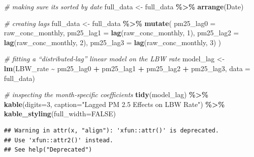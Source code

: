 \documentclass[
]{article}
\newenvironment{Shaded}{\begin{snugshade}}{\end{snugshade}}
\newcommand{\AttributeTok}[1]{\textcolor[rgb]{0.13,0.29,0.53}{#1}}
\newcommand{\CommentTok}[1]{\textcolor[rgb]{0.56,0.35,0.01}{\textit{#1}}}
\newcommand{\ConstantTok}[1]{\textcolor[rgb]{0.56,0.35,0.01}{#1}}
\newcommand{\DecValTok}[1]{\textcolor[rgb]{0.00,0.00,0.81}{#1}}
\newcommand{\FunctionTok}[1]{\textcolor[rgb]{0.13,0.29,0.53}{\textbf{#1}}}
\newcommand{\NormalTok}[1]{#1}
\newcommand{\OtherTok}[1]{\textcolor[rgb]{0.56,0.35,0.01}{#1}}
\newcommand{\SpecialCharTok}[1]{\textcolor[rgb]{0.81,0.36,0.00}{\textbf{#1}}}
\newcommand{\StringTok}[1]{\textcolor[rgb]{0.31,0.60,0.02}{#1}}
\begin{document}
\begin{Shaded}
\begin{Highlighting}[]
\CommentTok{\# making sure it\textquotesingle{}s sorted by date}
\NormalTok{full\_data }\OtherTok{\textless{}{-}}\NormalTok{ full\_data }\SpecialCharTok{\%\textgreater{}\%} 
  \FunctionTok{arrange}\NormalTok{(Date)}

\CommentTok{\# creating lags }
\NormalTok{full\_data }\OtherTok{\textless{}{-}}\NormalTok{ full\_data }\SpecialCharTok{\%\textgreater{}\%} 
  \FunctionTok{mutate}\NormalTok{(}
    \AttributeTok{pm25\_lag0 =}\NormalTok{ raw\_conc\_monthly,}
    \AttributeTok{pm25\_lag1 =} \FunctionTok{lag}\NormalTok{(raw\_conc\_monthly, }\DecValTok{1}\NormalTok{),}
    \AttributeTok{pm25\_lag2 =} \FunctionTok{lag}\NormalTok{(raw\_conc\_monthly, }\DecValTok{2}\NormalTok{),}
    \AttributeTok{pm25\_lag3 =} \FunctionTok{lag}\NormalTok{(raw\_conc\_monthly, }\DecValTok{3}\NormalTok{)}
\NormalTok{  )}

\CommentTok{\# fitting a “distributed‐lag” linear model on the LBW rate}
\NormalTok{model\_lag }\OtherTok{\textless{}{-}} \FunctionTok{lm}\NormalTok{(LBW\_rate }\SpecialCharTok{\textasciitilde{}}\NormalTok{ pm25\_lag0 }\SpecialCharTok{+}\NormalTok{ pm25\_lag1 }\SpecialCharTok{+}\NormalTok{ pm25\_lag2 }\SpecialCharTok{+}\NormalTok{ pm25\_lag3,}
                \AttributeTok{data =}\NormalTok{ full\_data)}

\CommentTok{\# inspecting the month‐specific coefficients}
\FunctionTok{tidy}\NormalTok{(model\_lag) }\SpecialCharTok{\%\textgreater{}\%} 
  \FunctionTok{kable}\NormalTok{(}\AttributeTok{digits=}\DecValTok{3}\NormalTok{, }\AttributeTok{caption=}\StringTok{"Lagged PM 2.5 Effects on LBW Rate"}\NormalTok{) }\SpecialCharTok{\%\textgreater{}\%}
  \FunctionTok{kable\_styling}\NormalTok{(}\AttributeTok{full\_width=}\ConstantTok{FALSE}\NormalTok{)}
\end{Highlighting}
\end{Shaded}

\begin{verbatim}
## Warning in attr(x, "align"): 'xfun::attr()' is deprecated.
## Use 'xfun::attr2()' instead.
## See help("Deprecated")
\end{verbatim}
\end{document}
